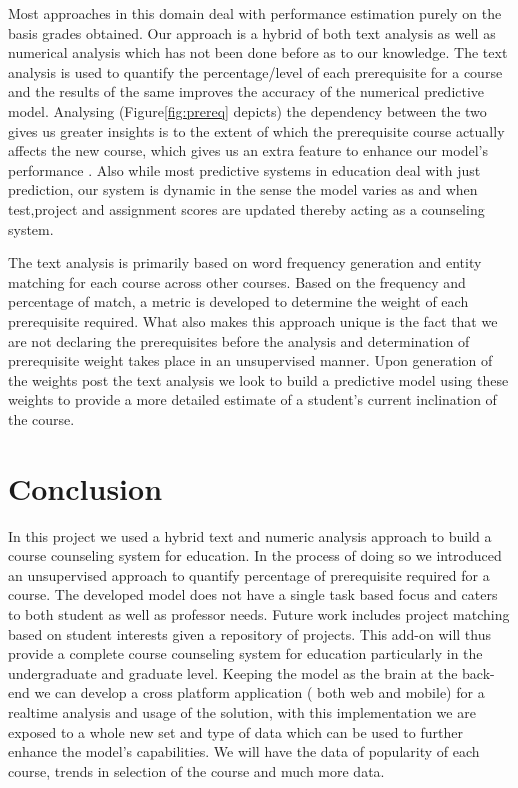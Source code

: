 \documentclass[conference]{IEEEtran}
\begin{document}
Most approaches in this domain deal with performance estimation purely on the basis grades obtained. Our approach is a hybrid of both text analysis as well as numerical analysis which has not been done before as to our knowledge. The text analysis is used to quantify the percentage/level of each prerequisite for a course and the results of the same improves the accuracy of the numerical predictive model. Analysing (Figure\ref{fig:prereq} depicts) the dependency between the two gives us greater insights is to the extent of which the prerequisite course actually affects the new course, which gives us an extra feature to enhance our model's performance . Also while most predictive systems in education deal with just prediction, our system is dynamic in the sense the model varies as and when test,project and assignment scores are updated thereby acting as a counseling system.

The text analysis is primarily based on word frequency generation and entity matching for each course across other courses. Based on the frequency and percentage of match, a metric is developed to determine the weight of each prerequisite required. What also makes this approach unique is the fact that we are not declaring the prerequisites before the analysis and determination of prerequisite weight takes place in an unsupervised manner. Upon generation of the weights post the text analysis we look to build a predictive model using these weights to provide a more detailed estimate of a student's current inclination of the course.

	\section{Conclusion}
In this project we used a hybrid text and numeric analysis approach to build a course counseling system for education. In the process of doing so we introduced an unsupervised approach to quantify percentage of prerequisite required for a course. The developed model does not have a single task based focus and caters to both student as well as professor needs. Future work includes project matching based on student interests given a repository of projects. This add-on will thus provide a complete course counseling system for education particularly in the undergraduate and graduate level. Keeping the model as the brain at the back-end we can develop a cross platform application ( both web and mobile) for a realtime analysis and usage of the solution, with this implementation we are exposed to a whole new set and type of data which can be used to further enhance the model's capabilities. We will have the data of popularity of each course, trends in selection of the course and much more data. 
\end{document}
